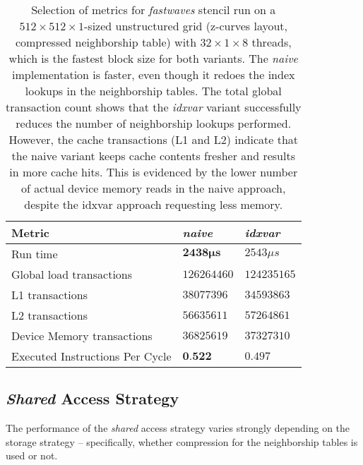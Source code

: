 \begin{table}
	\begin{tabular}{l l l}
		\hline
		Metric & \emph{naive} & \emph{idxvar} \\
		\hline
		Run time & $\mathbf{2438\mu s}$ & $2543\mu s$ \\
		Global load transactions & $126264460$ & $124235165$ \\
		L1 transactions & $38077396$ & $34593863$ \\
		L2 transactions & $56635611$ & $57264861$ \\
		Device Memory transactions & $36825619$ & $37327310$ \\
		Executed Instructions Per Cycle & $\textbf{0.522}$ & $0.497$ \\
		\hline
	\end{tabular}
	\caption{\label{tab:fastwaves-naive-idxvar-metrics}Selection of metrics for \emph{fastwaves} stencil run on a $512\times 512\times 1$-sized unstructured grid (z-curves layout, compressed neighborship table) with $32\times 1\times 8$ threads, which is the fastest block size for both variants. The \emph{naive} implementation is faster, even though it redoes the index lookups in the neighborship tables. The total global transaction count shows that the \emph{idxvar} variant successfully reduces the number of neighborship lookups performed. However, the cache transactions (L1 and L2) indicate that the naive variant keeps cache contents fresher and results in more cache hits. This is evidenced by the lower number of actual device memory reads in the naive approach, despite the idxvar approach requesting less memory.}
\end{table}


\subsection{\emph{Shared} Access Strategy}

The performance of the \emph{shared} access strategy varies strongly depending on the storage strategy -- specifically, whether compression for the neighborship tables is used or not.

